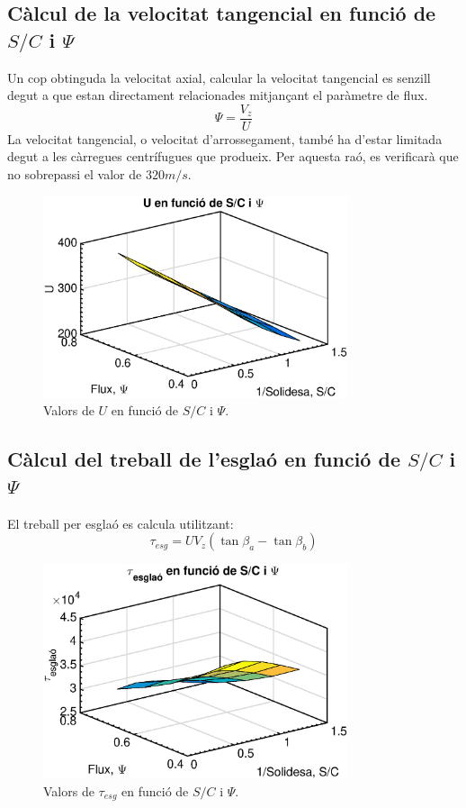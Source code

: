 \subsection{Càlcul de la velocitat tangencial en funció de $S/C$ i $\Psi$}
Un cop obtinguda la velocitat axial, calcular la velocitat tangencial es senzill degut a que estan directament relacionades mitjançant el paràmetre de flux. 
\begin{equation}
\Psi=\frac{V_z}{U}
\end{equation}
La velocitat tangencial, o velocitat d'arrossegament, també ha d'estar limitada degut a les càrregues centrífugues que produeix. Per aquesta raó, es verificarà que no sobrepassi el valor de $320m/s$.
\begin{figure}[H]
	\centering
	\includegraphics[width=0.8\textwidth]{./code/figures/parametres/U}
	\caption{Valors de $U$ en funció de $S/C$ i $\Psi$.}
	\label{U}
\end{figure}

\subsection{Càlcul del treball de l'esglaó en funció de $S/C$ i $\Psi$}
El treball per esglaó es calcula utilitzant:
\begin{equation}
\tau_{esg}=UV_z(\tan\beta_a-\tan\beta_b)
\end{equation}
\begin{figure}[H]
	\centering
	\includegraphics[width=0.8\textwidth]{./code/figures/parametres/TAUesg}
	\caption{Valors de $\tau_{esg}$ en funció de $S/C$ i $\Psi$.}
	\label{TAUesg}
\end{figure}

